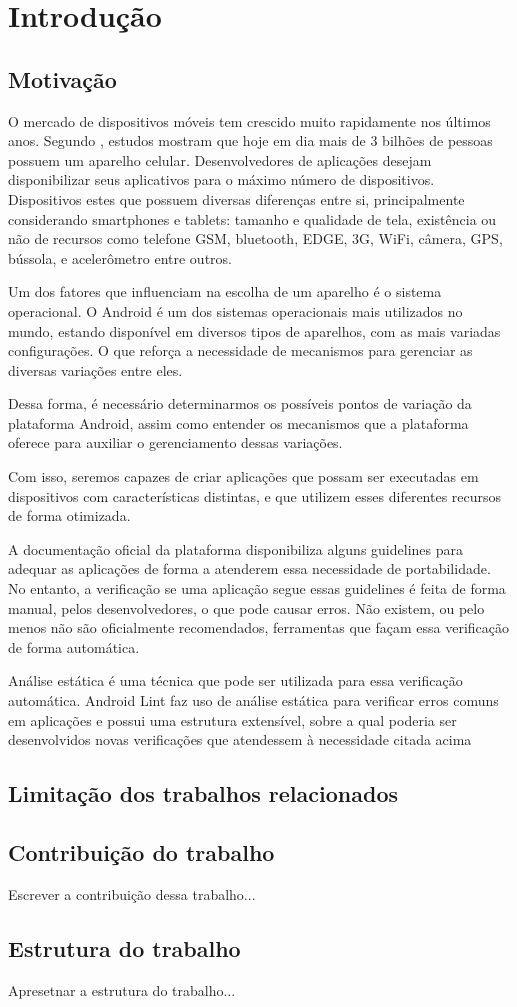 \chapter{Introdução}

\section{Motivação}
O mercado de dispositivos móveis tem crescido muito rapidamente nos últimos anos.
Segundo \cite{lecheta}, estudos mostram que hoje em dia mais de 3 bilhões de pessoas
possuem um aparelho celular. Desenvolvedores de aplicações desejam disponibilizar
seus aplicativos para o máximo número de dispositivos. Dispositivos estes que
possuem diversas diferenças entre si, principalmente considerando smartphones e
tablets: tamanho e qualidade de tela, existência ou não de recursos como telefone
GSM, bluetooth, EDGE, 3G, WiFi, câmera, GPS, bússola, e acelerômetro entre outros.

Um dos fatores que influenciam na escolha de um aparelho é o sistema operacional.
O Android é um dos sistemas operacionais mais utilizados no mundo, estando 
disponível em diversos tipos de aparelhos, com as mais variadas configurações.
O que reforça a necessidade de mecanismos para gerenciar as diversas variações entre 
eles.

Dessa forma, é necessário determinarmos os possíveis pontos de variação da plataforma
Android, assim como entender os mecanismos que a plataforma oferece para auxiliar
o gerenciamento dessas variações. 

Com isso, seremos capazes de criar aplicações que possam ser executadas em dispositivos
com características distintas, e que utilizem esses diferentes recursos de forma otimizada.

A documentação oficial da plataforma disponibiliza alguns guidelines para adequar
as aplicações de forma a atenderem essa necessidade de portabilidade. No entanto, 
a verificação se uma aplicação segue essas guidelines é feita de forma manual, pelos
desenvolvedores, o que pode causar erros. Não existem, ou pelo menos não são
oficialmente recomendados, ferramentas que façam essa verificação de forma automática.

Análise estática é uma técnica que pode ser utilizada para essa
verificação automática. Android Lint faz uso de análise estática para verificar
erros comuns em aplicações e possui uma estrutura extensível, sobre a qual poderia
ser desenvolvidos novas verificações que atendessem à necessidade citada acima

\section{Limitação dos trabalhos relacionados}


\section{Contribuição do trabalho}
Escrever a contribuição dessa trabalho...

\section{Estrutura do trabalho}
Apresetnar a estrutura do trabalho...
